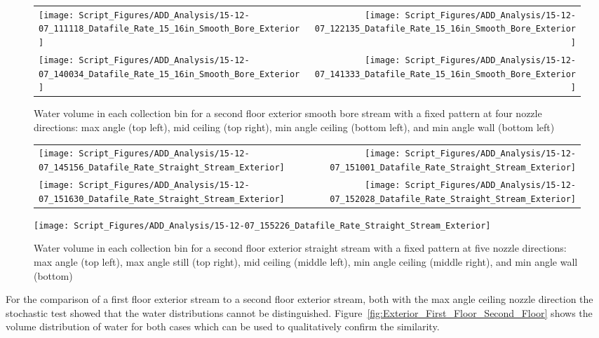 \documentclass{book}
\begin{document}
\begin{figure}[ht]
\begin{tabular*}{\textwidth}{lr}
\texttt{[image: Script\_Figures/ADD\_Analysis/15-12-07\_111118\_Datafile\_Rate\_15\_16in\_Smooth\_Bore\_Exterior]} &
\texttt{[image: Script\_Figures/ADD\_Analysis/15-12-07\_122135\_Datafile\_Rate\_15\_16in\_Smooth\_Bore\_Exterior]} \\
\texttt{[image: Script\_Figures/ADD\_Analysis/15-12-07\_140034\_Datafile\_Rate\_15\_16in\_Smooth\_Bore\_Exterior]} &
\texttt{[image: Script\_Figures/ADD\_Analysis/15-12-07\_141333\_Datafile\_Rate\_15\_16in\_Smooth\_Bore\_Exterior]} \\
\end{tabular*}
\caption{Water volume in each collection bin for a second floor exterior smooth bore stream with a fixed pattern at four nozzle directions: max angle (top left), mid ceiling (top right), min angle ceiling (bottom left), and min angle wall (bottom left)}
\label{fig:Exterior_Second_Floor_Varying_Nozzle_Directions_SB_Fixed_Pattern}
\end{figure}

\begin{figure}[ht]
\begin{tabular*}{\textwidth}{lr}
\texttt{[image: Script\_Figures/ADD\_Analysis/15-12-07\_145156\_Datafile\_Rate\_Straight\_Stream\_Exterior]} &
\texttt{[image: Script\_Figures/ADD\_Analysis/15-12-07\_151001\_Datafile\_Rate\_Straight\_Stream\_Exterior]} \\
\texttt{[image: Script\_Figures/ADD\_Analysis/15-12-07\_151630\_Datafile\_Rate\_Straight\_Stream\_Exterior]} &
\texttt{[image: Script\_Figures/ADD\_Analysis/15-12-07\_152028\_Datafile\_Rate\_Straight\_Stream\_Exterior]} \\
\end{tabular*}
\centering
\texttt{[image: Script\_Figures/ADD\_Analysis/15-12-07\_155226\_Datafile\_Rate\_Straight\_Stream\_Exterior]} \\
\caption{Water volume in each collection bin for a second floor exterior straight stream with a fixed pattern at five nozzle directions: max angle (top left), max angle still (top right), mid ceiling (middle left), min angle ceiling (middle right), and min angle wall (bottom)}
\label{fig:Exterior_Second_Floor_Varying_Nozzle_Directions_SS_Fixed_Pattern}
\end{figure}

\clearpage

For the comparison of a first floor exterior stream to a second floor exterior stream, both with the max angle ceiling nozzle direction the stochastic test showed that the water distributions cannot be distinguished. Figure~\ref{fig:Exterior_First_Floor_Second_Floor} shows the volume distribution of water for both cases which can be used to qualitatively confirm the similarity.
\end{document}
